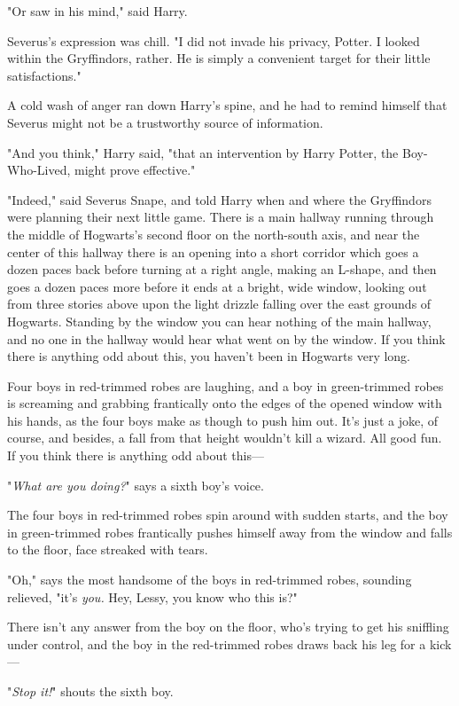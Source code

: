 "Or saw in his mind," said Harry.

Severus's expression was chill. "I did not invade his privacy, Potter. I looked
within the Gryffindors, rather. He is simply a convenient target for their
little satisfactions."

A cold wash of anger ran down Harry's spine, and he had to remind himself that
Severus might not be a trustworthy source of information.

"And you think," Harry said, "that an intervention by Harry Potter, the
Boy-Who-Lived, might prove effective."

"Indeed," said Severus Snape, and told Harry when and where the Gryffindors
were planning their next little game.
\sbreak
There is a main hallway running through the middle of Hogwarts's second floor
on the north-south axis, and near the center of this hallway there is an
opening into a short corridor which goes a dozen paces back before turning at a
right angle, making an L-shape, and then goes a dozen paces more before it ends
at a bright, wide window, looking out from three stories above upon the light
drizzle falling over the east grounds of Hogwarts. Standing by the window you
can hear nothing of the main hallway, and no one in the hallway would hear what
went on by the window. If you think there is anything odd about this, you
haven't been in Hogwarts very long.

Four boys in red-trimmed robes are laughing, and a boy in green-trimmed robes
is screaming and grabbing frantically onto the edges of the opened window with
his hands, as the four boys make as though to push him out. It's just a joke,
of course, and besides, a fall from that height wouldn't kill a wizard. All
good fun. If you think there is anything odd about this---

"\emph{What are you doing?}" says a sixth boy's voice.

The four boys in red-trimmed robes spin around with sudden starts, and the boy
in green-trimmed robes frantically pushes himself away from the window and
falls to the floor, face streaked with tears.

"Oh," says the most handsome of the boys in red-trimmed robes, sounding
relieved, "it's \emph{you.} Hey, Lessy, you know who this is?"

There isn't any answer from the boy on the floor, who's trying to get his
sniffling under control, and the boy in the red-trimmed robes draws back his
leg for a kick---

"\emph{Stop it!}" shouts the sixth boy.

